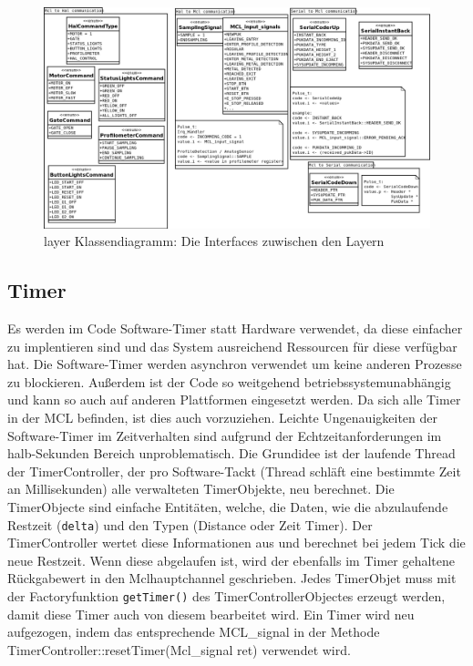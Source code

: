 \documentclass[
   draft=false
  ,paper=a4
  ,twoside=true
  ,fontsize=11pt
  ,headsepline
  ,DIV11
  ,parskip=full+
]{scrartcl} %
\begin{document}
\begin{figure}[htp]
  	\centering
    \includegraphics[width=\textwidth]{./IMG/interLayerCom.png}
    \caption[layer]{layer Klassendiagramm: Die Interfaces zuwischen den Layern}
     \label{fig:layer}
\end{figure}
\newline

\subsection{Timer}
Es werden im Code Software-Timer statt Hardware verwendet, da diese einfacher zu implentieren sind und das System ausreichend Ressourcen für diese verfügbar hat. Die Software-Timer werden asynchron verwendet um keine anderen Prozesse zu blockieren. Außerdem ist der Code so weitgehend betriebssystemunabhängig und kann so auch auf anderen Plattformen eingesetzt werden. Da sich alle Timer in der MCL befinden, ist dies auch vorzuziehen. Leichte Ungenauigkeiten der Software-Timer im Zeitverhalten sind aufgrund der Echtzeitanforderungen im halb-Sekunden Bereich unproblematisch.
\newline
Die Grundidee ist der laufende Thread der TimerController, der pro Software-Tackt (Thread schläft eine bestimmte Zeit an Millisekunden) alle verwalteten TimerObjekte, neu berechnet. Die TimerObjecte sind einfache Entitäten, welche, die Daten, wie die abzulaufende Restzeit (\texttt{delta}) und den Typen (Distance oder Zeit Timer). 
Der TimerController wertet diese Informationen aus und berechnet bei jedem Tick die neue Restzeit. Wenn diese abgelaufen ist, wird der ebenfalls im Timer gehaltene Rückgabewert in den Mclhauptchannel geschrieben.
Jedes TimerObjet muss mit der Factoryfunktion \texttt{getTimer()} des TimerControllerObjectes erzeugt werden, damit diese Timer auch von diesem bearbeitet wird. Ein Timer wird neu aufgezogen, indem das entsprechende MCL\_signal in der Methode TimerController::resetTimer(Mcl\_signal ret) verwendet wird. 
\end{document}
